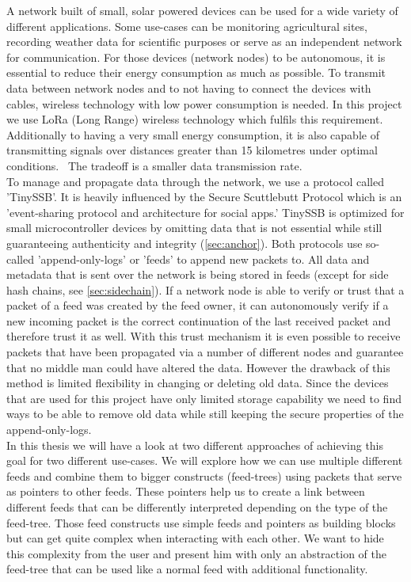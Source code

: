 A network built of small, solar powered devices can be used for a wide variety of different applications. Some use-cases can be monitoring agricultural sites, recording weather data for scientific purposes or serve as an independent network for communication. For those devices (network nodes) to be autonomous, it is essential to reduce their energy consumption as much as possible. To transmit data between network nodes and to not having to connect the devices with cables, wireless technology with low power consumption is needed. In this project we use LoRa (Long Range) wireless technology which fulfils this requirement. Additionally to having a very small energy consumption, it is also capable of transmitting signals over distances greater than 15 kilometres under optimal conditions.~\cite{10.1007/978-3-030-01168-0_11} The tradeoff is a smaller data transmission rate. \\
To manage and propagate data through the network, we use a protocol called 'TinySSB'. It is heavily influenced by the Secure Scuttlebutt Protocol which is an 'event-sharing protocol and architecture for social apps.' \cite{10.1145/3357150.3357396} TinySSB is optimized for small microcontroller devices by omitting data that is not essential while still guaranteeing authenticity and integrity (\cref{sec:anchor}). Both protocols use so-called 'append-only-logs' or 'feeds' to append new packets to. All data and metadata that is sent over the network is being stored in feeds (except for side hash chains, see \cref{sec:sidechain}). If a network node is able to verify or trust that a packet of a feed was created by the feed owner, it can autonomously verify if a new incoming packet is the correct continuation of the last received packet and therefore trust it as well. With this trust mechanism it is even possible to receive packets that have been propagated via a number of different nodes and guarantee that no middle man could have altered the data. However the drawback of this method is limited flexibility in changing or deleting old data. Since the devices that are used for this project have only limited storage capability we need to find ways to be able to remove old data while still keeping the secure properties of the append-only-logs. \\
In this thesis we will have a look at two different approaches of achieving this goal for two different use-cases. We will explore how we can use multiple different feeds and combine them to bigger constructs (feed-trees) using packets that serve as pointers to other feeds. These pointers help us to create a link between different feeds that can be differently interpreted depending on the type of the feed-tree. Those feed constructs use simple feeds and pointers as building blocks but can get quite complex when interacting with each other. We want to hide this complexity from the user and present him with only an abstraction of the feed-tree that can be used like a normal feed with additional functionality. \\
